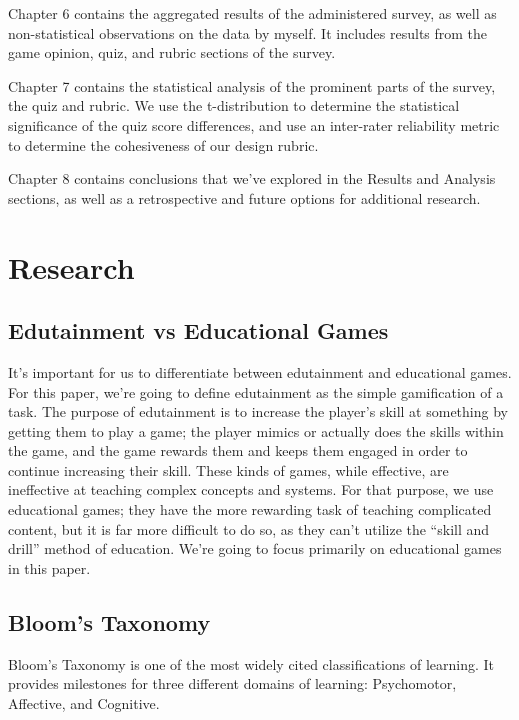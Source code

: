 \documentclass[12pt]{report}
\begin{document}
		Chapter 6 contains the aggregated results of the administered survey, as well as non-statistical observations on the data by myself. It includes results from the game opinion, quiz, and rubric sections of the survey.

		Chapter 7 contains the statistical analysis of the prominent parts of the survey, the quiz and rubric. We use the t-distribution to determine the statistical significance of the quiz score differences, and use an inter-rater reliability metric to determine the cohesiveness of our design rubric.

		Chapter 8 contains conclusions that we've explored in the Results and Analysis sections, as well as a retrospective and future options for additional research.

\chapter{Research}
	\section{Edutainment vs Educational Games}

		It's important for us to differentiate between edutainment and educational games. For this paper, we're going to define edutainment as the simple gamification of a task. The purpose of edutainment is to increase the player's skill at something by getting them to play a game; the player mimics or actually does the skills within the game, and the game rewards them and keeps them engaged in order to continue increasing their skill. These kinds of games, while effective, are ineffective at teaching complex concepts and systems. For that purpose, we use educational games; they have the more rewarding task of teaching complicated content, but it is far more difficult to do so, as they can't utilize the “skill and drill” method of education. We're going to focus primarily on educational games in this paper.


	\section{Bloom's Taxonomy}

		Bloom's Taxonomy is one of the most widely cited classifications of learning. It provides milestones for three different domains of learning: Psychomotor, Affective, and Cognitive.
\end{document}
